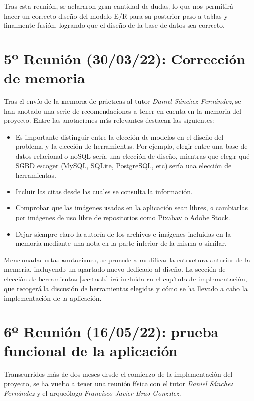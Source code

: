 Tras esta reunión, se aclararon gran cantidad de dudas, lo que nos permitirá hacer un
correcto diseño del modelo E/R para su posterior paso a tablas y finalmente fusión, logrando
que el diseño de la base de datos sea correcto.

\section{5º Reunión (30/03/22): Corrección de memoria}
Tras el envío de la memoria de prácticas al tutor \textit{Daniel Sánchez Fernández}, se
han anotado una serie de recomendaciones a tener en cuenta en la memoria del proyecto. Entre
las anotaciones más relevantes destacan las siguientes:

    \begin{itemize}
        \item Es importante distinguir entre la elección de modelos en el diseño del problema
        y la elección de herramientas. Por ejemplo, elegir entre una base de datos relacional
        o noSQL sería una elección de diseño, mientras que elegir qué SGBD escoger (MySQL,
        SQLite, PostgreSQL, etc) sería una elección de herramientas.
        \item Incluir las citas desde las cuales se consulta la información.
        \item Comprobar que las imágenes usadas en la aplicación sean libres, o cambiarlas
        por imágenes de uso libre de repositorios como \href{https://pixabay.com/}{Pixabay} o
        \href{https://stock.adobe.com/es/}{Adobe Stock}.
        \item Dejar siempre claro la autoría de los archivos e imágenes incluidas en la memoria
        mediante una nota en la parte inferior de la misma o similar.
    \end{itemize}

Mencionadas estas anotaciones, se procede a modificar la estructura anterior de la memoria,
incluyendo un apartado nuevo dedicado al diseño. La sección de elección de herramientas
\ref{sec:tools} irá incluida en el capítulo de implementación, que recogerá la discusión de
herramientas elegidas y cómo se ha llevado a cabo la implementación de la aplicación.

\section{6º Reunión (16/05/22): prueba funcional de la aplicación}
Transcurridos más de dos meses desde el comienzo de la implementación del proyecto, se ha
vuelto a tener una reunión física con el tutor \textit{Daniel Sánchez Fernández} y el
arqueólogo \textit{Francisco Javier Brao Gonzalez}.\\

